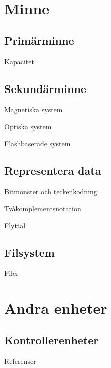\documentclass{beamer}
\theoremstyle{definition}
\theoremstyle{remark}
\begin{document}
\begin{frame}{\insertsubsectionhead}
\end{frame}


\section{Minne}

\subsection{Primärminne}

\begin{frame}{\insertsubsectionhead}{Kapacitet}
\end{frame}

\subsection{Sekundärminne}

\begin{frame}{\insertsubsectionhead}{Magnetiska system}
\end{frame}

\begin{frame}{\insertsubsectionhead}{Optiska system}
\end{frame}

\begin{frame}{\insertsubsectionhead}{Flashbaserade system}
\end{frame}

\subsection{Representera data}

\begin{frame}{\insertsubsectionhead}{Bitmönster och teckenkodning}
\end{frame}

\begin{frame}{\insertsubsectionhead}{Tvåkomplementsnotation}
\end{frame}

\begin{frame}{\insertsubsectionhead}{Flyttal}
\end{frame}

\subsection{Filsystem}

\begin{frame}{\insertsubsectionhead}{Filer}
\end{frame}


\section{Andra enheter}

\subsection{Kontrollerenheter}

\begin{frame}{\insertsubsectionhead}
\end{frame}



\begin{frame}{Referenser}
  
\end{frame}
\end{document}
